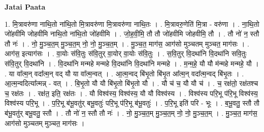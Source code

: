 \documentclass[17pt]{extarticle}
\begin{document}
\textbf{Jatai Paata} \newline

1. मि॒त्रावरु॑णा नाथि॒तो ना॑थि॒तो मि॒त्रावरु॑णा मि॒त्रावरु॑णा नाथि॒तः । . मि॒त्रावरु॒णेति॑ मि॒त्रा - वरु॑णा । . ना॒थि॒तो जो॑हवीमि जोहवीमि नाथि॒तो ना॑थि॒तो जो॑हवीमि । . जो॒ह॒वी॒मि॒ तौ तौ जो॑हवीमि जोहवीमि॒ तौ । . तौ नो॑ न॒ स्तौ तौ नः॑ । . नो॒ मु॒ञ्च॒त॒म् मु॒ञ्च॒त॒म् नो॒ नो॒ मु॒ञ्च॒त॒म् । . मु॒ञ्च॒त॒ माग॑स॒ आग॑सो मुञ्चतम् मुञ्चत॒ माग॑सः । . आग॑स॒ इत्याग॑सः । . वा॒योः स॑वि॒तुः स॑वि॒तुर् वा॒योर् वा॒योः स॑वि॒तुः । . स॒वि॒तुर् वि॒दथा॑नि वि॒दथा॑नि सवि॒तुः स॑वि॒तुर् वि॒दथा॑नि । . वि॒दथा॑नि मन्महे मन्महे वि॒दथा॑नि वि॒दथा॑नि मन्महे । . म॒न्म॒हे॒ यौ यौ म॑न्महे मन्महे॒ यौ । . या वा᳚त्म॒न् वदा᳚त्म॒न् वद् यौ या वा᳚त्म॒न्वत् । . आ॒त्म॒न्वद् बि॑भृ॒तो बि॑भृ॒त आ᳚त्म॒न् वदा᳚त्म॒न्वद् बि॑भृ॒तः । . आ॒त्म॒न्वदित्या᳚त्मन्न् - वत् । . बि॒भृ॒तो यौ यौ बि॑भृ॒तो बि॑भृ॒तो यौ । . यौ च॑ च॒ यौ यौ च॑ । . च॒ रक्ष॑तो॒ रक्ष॑तश्च च॒ रक्ष॑तः । . रक्ष॑त॒ इति॒ रक्ष॑तः । . यौ विश्व॑स्य॒ विश्व॑स्य॒ यौ यौ विश्व॑स्य । . विश्व॑स्य परि॒भू प॑रि॒भू विश्व॑स्य॒ विश्व॑स्य परि॒भू । . प॒रि॒भू ब॑भू॒वतु॑र् बभू॒वतुः॑ परि॒भू प॑रि॒भू ब॑भू॒वतुः॑ । . प॒रि॒भू इति॑ परि - भूः । . ब॒भू॒वतु॒ स्तौ तौ ब॑भू॒वतु॑र् बभू॒वतु॒ स्तौ । . तौ नो॑ न॒ स्तौ तौ नः॑ । . नो॒ मु॒ञ्च॒त॒म् मु॒ञ्च॒त॒म् नो॒ नो॒ मु॒ञ्च॒त॒म् । . मु॒ञ्च॒त॒ माग॑स॒ आग॑सो मुञ्चतम् मुञ्चत॒ माग॑सः । \newline
\end{document}
